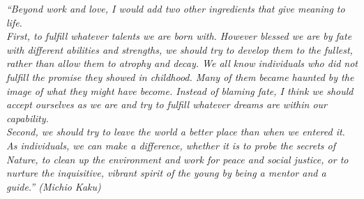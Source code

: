 
\renewcommand{\epigraphname}{EPÍGRAFE}

\begin{epigrafe}

\textit{“Beyond work and love, I would add two other ingredients that give meaning to life.\\ 
First, to fulfill whatever talents we are born with. However blessed we are by fate with different abilities and strengths, we should try to develop them to the fullest, rather than allow them to atrophy and decay. We all know individuals who did not fulfill the promise they showed in childhood. Many of them became haunted by the image of what they might have become. Instead of blaming fate, I think we should accept ourselves as we are and try to fulfill whatever dreams are within our capability.\\
Second, we should try to leave the world a better place than when we entered it. As individuals, we can make a difference, whether it is to probe the secrets of Nature, to clean up the environment and work for peace and social justice, or to nurture the inquisitive, vibrant spirit of the young by being a mentor and a guide.”
(Michio Kaku)}

\end{epigrafe}


